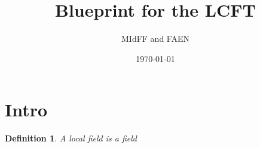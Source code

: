 \documentclass[11pt]{amsart}
\date{\today}
\title{Blueprint for the LCFT}
\author{MIdFF and FAEN}
\newtheorem{definition}{Definition}
\begin{document}
\section{Intro}
\begin{definition}
\label{def_local_field}
A local field is a field
\end{definition}

%
%
%
\end{document}
